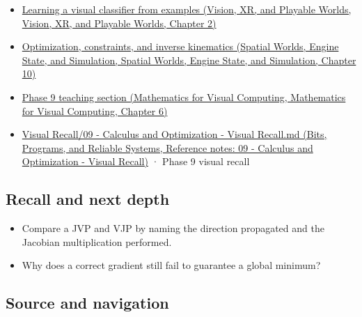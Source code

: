 \begin{itemize}
\tightlist
\item
  \href{../07-Vision-XR-and-Playable-Worlds/main.pdf\#nameddest=04-visual-computing-ii-ch031-learning-a-visual-classifier-from-examples}{Learning a visual classifier from examples (Vision, XR, and Playable Worlds, Vision, XR, and Playable Worlds, Chapter 2)}
\item
  \href{../05-Spatial-Worlds-Engine-State-and-Simulation/main.pdf\#nameddest=04-visual-computing-ii-ch029-optimization-constraints-and-inverse-kinematics}{Optimization, constraints, and inverse kinematics (Spatial Worlds, Engine State, and Simulation, Spatial Worlds, Engine State, and Simulation, Chapter 10)}
\item
  \href{../02-Mathematics-for-Visual-Computing/main.pdf\#nameddest=02-foundations-ii-ch022-numerical-differentiation-and-automatic-differentiation}{Phase 9 teaching section (Mathematics for Visual Computing, Mathematics for Visual Computing, Chapter 6)}
\item
  \href{../01-Bits-Programs-and-Reliable-Systems/main.pdf\#nameddest=appendix-adf48f5dc5c1}{Visual Recall/09 - Calculus and Optimization - Visual Recall.md (Bits, Programs, and Reliable Systems, Reference notes: 09 - Calculus and Optimization - Visual Recall)} · Phase 9 visual recall
\end{itemize}

\subsection{Recall and next depth}\label{appendix-40df0855b4a7-recall-and-next-depth}

\begin{itemize}
\tightlist
\item
  Compare a JVP and VJP by naming the direction propagated and the Jacobian multiplication performed.
\item
  Why does a correct gradient still fail to guarantee a global minimum?
\end{itemize}

\subsection{Source and navigation}\label{appendix-40df0855b4a7-source-and-navigation}

